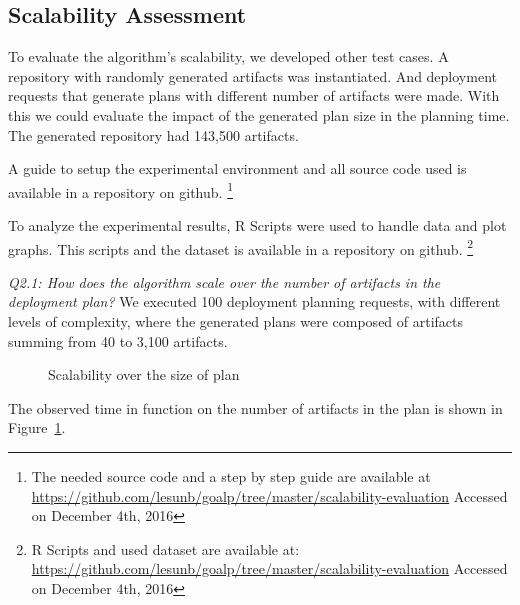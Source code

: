
\subsection{Scalability Assessment}

To evaluate the algorithm's scalability, we developed other test cases.  A repository with randomly generated artifacts was instantiated. And deployment requests that generate plans with different number of artifacts were made. With this we could evaluate the impact of the generated plan size in the planning time.
The generated repository had 143,500 artifacts.

A guide to setup the experimental environment and all source code used is available in a repository on github.
\footnote{The needed source code and a step by step guide are available at
\url{https://github.com/lesunb/goalp/tree/master/scalability-evaluation} Accessed on December 4th, 2016}

To analyze the experimental results, R Scripts\cite{the_r_foundation_r_2016} were used to handle data and plot graphs. This scripts and the dataset is available in a repository on github.
\footnote{R Scripts and used dataset are available at:
\url{https://github.com/lesunb/goalp/tree/master/scalability-evaluation} Accessed on December 4th, 2016}

\emph{Q2.1: How does the algorithm scale over the number of artifacts in the deployment plan?} We executed 100 deployment planning requests, with different levels of complexity, where the generated plans were composed of artifacts summing from 40 to 3,100 artifacts.

\begin{figure}[!htb]
  \centering
  \caption{Scalability over the size of plan}
\label{graph_plan_size_and_time}
\end{figure}

The observed time in function on the number of artifacts in the plan is shown in Figure~\ref{graph_plan_size_and_time}.

